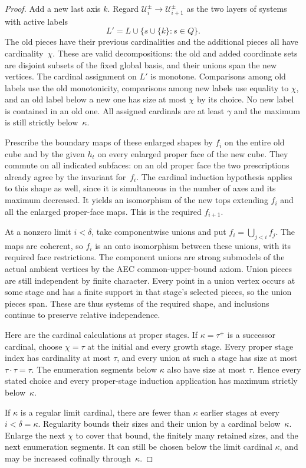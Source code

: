 \begin{proof}
Add a new last axis $k$.  Regard
$\mathcal U_i^\pm\to\mathcal U_{i+1}^\pm$ as the two layers
of systems with active labels
\[
 L'=L\cup\{s\cup\{k\}:s\in Q\}.
\]
The old pieces have their previous cardinalities and the
additional pieces all have cardinality~$\chi$.  These are
valid decompositions: the old and added coordinate sets are
disjoint subsets of the fixed global basis, and their unions
span the new vertices.  The cardinal assignment on $L'$ is
monotone.  Comparisons among old labels use the old
monotonicity, comparisons among new labels use equality to
$\chi$, and an old label below a new one has size at most
$\chi$ by its choice.  No new label is contained in an old
one.  All assigned cardinals are at least $\gamma$ and the
maximum is still strictly below~$\kappa$.

Prescribe the boundary maps of these enlarged shapes by $f_i$
on the entire old cube and by the given $h_t$ on every enlarged
proper face of the new cube.  They commute on all indicated
subfaces: on an old proper face the two prescriptions already
agree by the invariant for~$f_i$.  The cardinal induction
hypothesis applies to this shape as well, since it is
simultaneous in the number of axes and its maximum decreased.
It yields an isomorphism of the new tops extending $f_i$ and
all the enlarged proper-face maps.  This is the required
$f_{i+1}$.

At a nonzero limit $i<\delta$, take componentwise unions and
put $f_i=\bigcup_{j<i}f_j$.  The maps are coherent, so $f_i$
is an onto isomorphism between these unions, with its required
face restrictions.  The component unions are strong submodels
of the actual ambient vertices by the AEC common-upper-bound
axiom.  Union pieces are still independent by finite
character.  Every point in a union vertex occurs at some
stage and has a finite support in that stage's selected
pieces, so the union pieces span.  These are thus systems
of the required shape, and inclusions continue to preserve
relative independence.

Here are the cardinal calculations at proper stages.  If
$\kappa=\tau^+$ is a successor cardinal, choose
$\chi=\tau$ at the initial and every growth stage.  Every
proper stage index has cardinality at most $\tau$, and every
union at such a stage has size at most
$\tau\cdot\tau=\tau$.  The enumeration segments below
$\kappa$ also have size at most $\tau$.  Hence every stated
choice and every proper-stage induction application has
maximum strictly below~$\kappa$.

If $\kappa$ is a regular limit cardinal, there are fewer than
$\kappa$ earlier stages at every $i<\delta=\kappa$.
Regularity bounds their sizes and their union by a cardinal
below~$\kappa$.  Enlarge the next $\chi$ to cover that bound,
the finitely many retained sizes, and the next enumeration
segments.  It can still be chosen below the limit cardinal
$\kappa$, and may be increased cofinally through~$\kappa$.


\end{proof}
